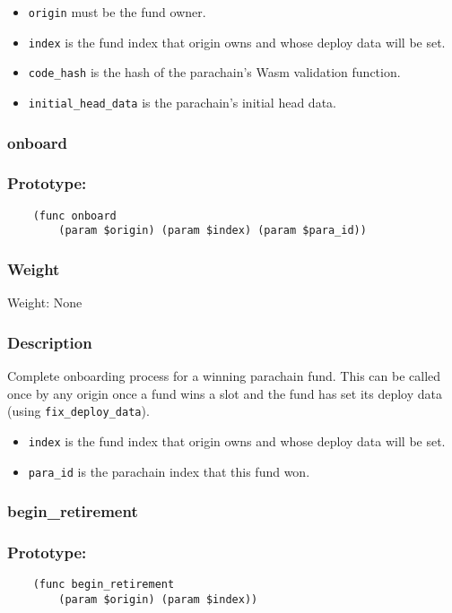 \documentclass[11pt,a4paper]{article}
\begin{document}
\begin{itemize}
\item \verb|origin| must be the fund owner.
\item \verb|index| is the fund index that origin owns and whose deploy data will be set.
\item \verb|code_hash| is the hash of the parachain's Wasm validation function.
\item \verb|initial_head_data| is the parachain's initial head data.
\end{itemize}

\subsubsection{onboard}
\subsubsection*{Prototype:}
\begin{verbatim}
    (func onboard
        (param $origin) (param $index) (param $para_id))
\end{verbatim}
\subsubsection*{Weight}
Weight: None
\subsubsection*{Description}
Complete onboarding process for a winning parachain fund. This can be called once by any origin once a fund wins a slot and the fund has set its deploy data (using \verb|fix_deploy_data|).

\begin{itemize}
\item \verb|index| is the fund index that origin owns and whose deploy data will be set.
\item \verb|para_id| is the parachain index that this fund won.
\end{itemize}

\subsubsection{begin\_retirement}
\subsubsection*{Prototype:}
\begin{verbatim}
    (func begin_retirement
        (param $origin) (param $index))
\end{verbatim}
\end{document}
